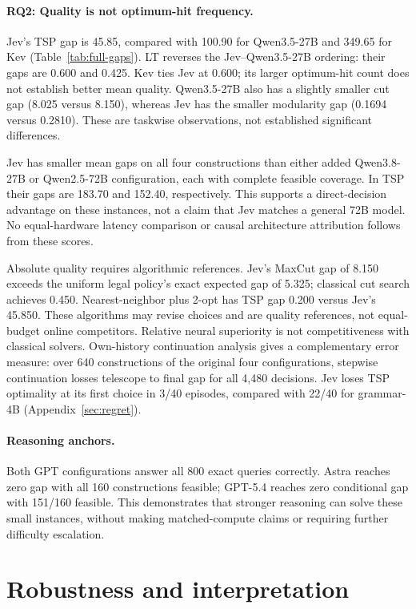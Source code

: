 \paragraph{RQ2: Quality is not optimum-hit frequency.}
Jev's TSP gap is 45.85, compared with 100.90 for Qwen3.5-27B and
349.65 for Kev (Table~\ref{tab:full-gaps}). LT reverses the Jev--Qwen3.5-27B
ordering: their gaps are 0.600 and 0.425. Kev ties Jev at 0.600;
its larger optimum-hit count does not establish better mean quality.
Qwen3.5-27B also has a slightly smaller cut gap (8.025 versus 8.150),
whereas Jev has the smaller modularity gap (0.1694 versus 0.2810).
These are taskwise observations, not established significant differences.

Jev has smaller mean gaps on all four constructions than either added
Qwen3.8-27B or Qwen2.5-72B configuration, each with complete feasible
coverage. In TSP their gaps are 183.70 and 152.40, respectively.
This supports a direct-decision advantage on these instances, not a
claim that Jev matches a general 72B model. No equal-hardware latency comparison
or causal architecture attribution follows from these scores.

Absolute quality requires algorithmic references. Jev's MaxCut gap of
8.150 exceeds the uniform legal policy's exact expected gap of 5.325;
classical cut search achieves 0.450. Nearest-neighbor plus 2-opt has
TSP gap 0.200 versus Jev's 45.850. These algorithms may revise choices
and are quality references, not equal-budget online competitors.
Relative neural superiority is not competitiveness with classical solvers.
Own-history continuation analysis gives a complementary error measure:
over 640 constructions of the original four configurations, stepwise
continuation losses telescope to final gap for all 4,480 decisions.
Jev loses TSP optimality at its first choice in 3/40 episodes, compared
with 22/40 for grammar-4B (Appendix~\ref{sec:regret}).

\paragraph{Reasoning anchors.}
Both GPT configurations answer all 800 exact queries correctly.
Astra reaches zero gap with all 160 constructions feasible; GPT-5.4
reaches zero conditional gap with 151/160 feasible. This demonstrates
that stronger reasoning can solve these small instances, without making
matched-compute claims or requiring further difficulty escalation.

\section{Robustness and interpretation}
\label{sec:discussion}
